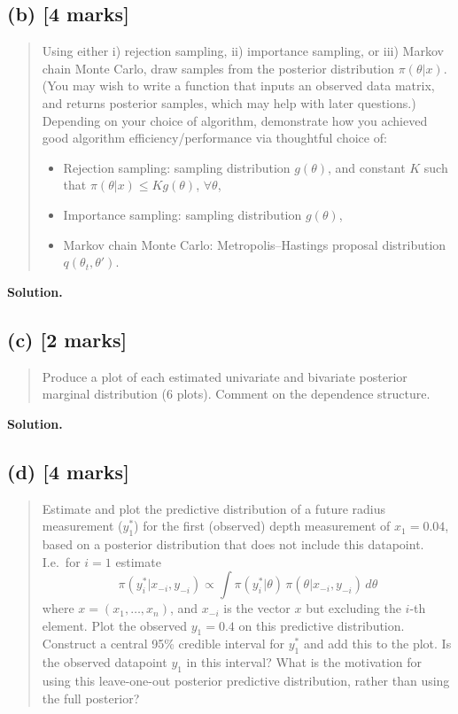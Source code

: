 \documentclass{article}
\newenvironment{question}{\begin{quote}\small}{\end{quote}}
\newcommand{\solution}{\noindent\textbf{Solution.}\ }
\begin{document}
\subsection*{(b) [4 marks]}

\begin{question}
Using either i) rejection sampling, ii) importance sampling, or iii) Markov chain Monte Carlo, draw samples from the posterior distribution $\pi(\theta|x)$. (You may wish to write a function that inputs an observed data matrix, and returns posterior samples, which may help with later questions.) Depending on your choice of algorithm, demonstrate how you achieved good algorithm efficiency/performance via thoughtful choice of:
\begin{itemize}
    \item Rejection sampling: sampling distribution $g(\theta)$, and constant $K$ such that $\pi(\theta|x) \leq K g(\theta)$, $\forall\theta$,
    \item Importance sampling: sampling distribution $g(\theta)$,
    \item Markov chain Monte Carlo: Metropolis--Hastings proposal distribution $q(\theta_t, \theta')$.
\end{itemize}
\end{question}

\solution

\subsection*{(c) [2 marks]}

\begin{question}
Produce a plot of each estimated univariate and bivariate posterior marginal distribution (6 plots). Comment on the dependence structure.
\end{question}

\solution

\subsection*{(d) [4 marks]}

\begin{question}
Estimate and plot the predictive distribution of a future radius measurement ($y_1^*$) for the first (observed) depth measurement of $x_1 = 0.04$, based on a posterior distribution that does not include this datapoint. I.e.\ for $i = 1$ estimate
\[
    \pi(y_i^* | x_{-i}, y_{-i}) \propto \int \pi(y_i^* | \theta) \, \pi(\theta | x_{-i}, y_{-i}) \, d\theta
\]
where $x = (x_1, \dots, x_n)$, and $x_{-i}$ is the vector $x$ but excluding the $i$-th element. Plot the observed $y_1 = 0.4$ on this predictive distribution. Construct a central 95\% credible interval for $y_1^*$ and add this to the plot. Is the observed datapoint $y_1$ in this interval? What is the motivation for using this leave-one-out posterior predictive distribution, rather than using the full posterior?
\end{question}
\end{document}
